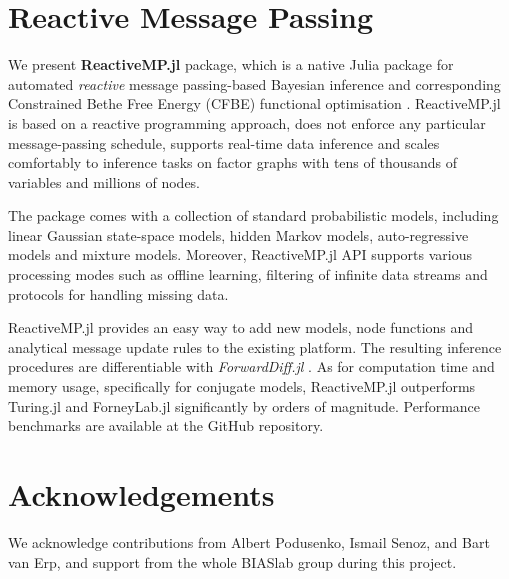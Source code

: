 \documentclass{juliacon}
\begin{document}
\section{Reactive Message Passing}

We present \textbf{ReactiveMP.jl} package, which is a native Julia \cite{bezanson2017julia} package for automated \textit{reactive} message passing-based Bayesian inference and corresponding
Constrained Bethe Free Energy (CFBE) functional optimisation \cite{senoz_local_constraint_2021}. ReactiveMP.jl is based on a reactive programming approach, does not enforce any particular message-passing schedule, 
supports real-time data inference and scales comfortably to inference tasks on factor graphs with tens of thousands of variables and millions of nodes.

The package comes with a collection of standard probabilistic models, including linear Gaussian state-space models, hidden Markov models, auto-regressive models and mixture models. 
Moreover, ReactiveMP.jl API supports various processing modes such as offline learning, filtering of infinite data streams and protocols for handling missing data.

ReactiveMP.jl provides an easy way to add new models, node functions and analytical message update rules to the existing platform. 
The resulting inference procedures are differentiable with \textit{ForwardDiff.jl} \cite{RevelsLubinPapamarkou2016}. As for computation time and memory usage, 
specifically for conjugate models, ReactiveMP.jl outperforms Turing.jl and ForneyLab.jl significantly by orders of magnitude. Performance benchmarks are available at the GitHub repository.

\section{Acknowledgements}

We acknowledge contributions from Albert Podusenko, Ismail Senoz, and Bart van Erp, and support from the whole BIASlab group during this project.


\end{document}
